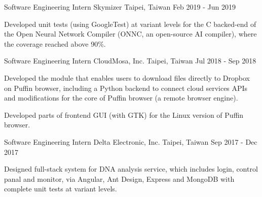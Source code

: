 \begin{cventries}
  \cventry
    {Software Engineering Intern} %
    {Skymizer} %
    {Taipei, Taiwan} %
    {Feb 2019 - Jun 2019} %
    {
      \begin{cvitems} %
        \item {Developed unit tests (using GoogleTest) at variant levels for the C backed-end of
        the Open Neural Network Compiler (ONNC, an open-source AI compiler),
        where the coverage reached above 90\%.}
      \end{cvitems}
    }

    \vspace{-2mm}


  \cventry
    {Software Engineering Intern} %
    {CloudMosa, Inc.} %
    {Taipei, Taiwan} %
    {Jul 2018 - Sep 2018} %
    {
      \begin{cvitems} %
        \item {Developed the module that enables users to download files directly to Dropbox on Puffin browser,
        including a Python backend to connect cloud services APIs and modifications for the core of Puffin browser (a remote browser engine).}
        \item {Developed parts of frontend GUI (with GTK) for the Linux version of Puffin browser.}
      \end{cvitems}
    }

    \vspace{-2mm}


  \cventry
    {Software Engineering Intern} %
    {Delta Electronic, Inc.} %
    {Taipei, Taiwan} %
    {Sep 2017 - Dec 2017} %
    {
      \begin{cvitems} %
        \item {Designed full-stack system for DNA analysis service, which includes login, control panal and monitor,
        via Angular, Ant Design, Express and MongoDB with complete unit tests at variant levels.}
      \end{cvitems}
    }

    \vspace{-2mm}



\end{cventries}
